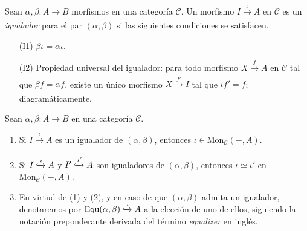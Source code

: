 \documentclass[tesis]{subfiles}
\begin{document}
\begin{Def} \label{Def: Igualador}
    Sean $\alpha,\beta:A\to B$ morfismos en una categoría $\mathscr{C}$. Un morfismo $I\xrightarrow[]{\iota} A$ en $\mathscr{C}$ es un \emph{igualador} para el par $(\alpha,\beta)$ si las siguientes condiciones se satisfacen.

    \begin{itemize}
        \item[(I1)] $\beta\iota=\alpha\iota$.

        \item[(I2)] Propiedad universal del igualador: para todo morfismo $X\xrightarrow[]{f} A$ en $\mathscr{C}$ tal que $\beta f=\alpha f$, existe un único morfismo $X\xrightarrow[]{f'} I$ tal que $\iota f' = f$; diagramáticamente,
            \begin{center}
            \end{center}
    \end{itemize}
\end{Def}

\begin{Obs} \label{Mendoza-1.1.4}
    Sean $\alpha,\beta:A\to B$ en una categoría $\mathscr{C}$.
    \begin{enumerate}[label=(\arabic*)]
        \item Si $I\xrightarrow[]{\iota} A$ es un igualador de $(\alpha,\beta)$, entonces $\iota\in\text{Mon}_\mathscr{C}(-,A)$.

        \item Si $I\xhookrightarrow{\iota} A$ y $I'\xhookrightarrow{\iota'} A$ son igualadores de $(\alpha,\beta)$, entonces $\iota\simeq\iota'$ en $\text{Mon}_\mathscr{C}(-,A)$.

            \item En virtud de (1) y (2), y en caso de que $(\alpha,\beta)$ admita un igualador, denotaremos por $\text{Equ}(\alpha,\beta)\xhookrightarrow[]{\iota}A$ a la elección de uno de ellos, siguiendo la notación preponderante derivada del término \emph{equalizer} en inglés.

        \end{enumerate}
    \end{Obs}
\end{document}
